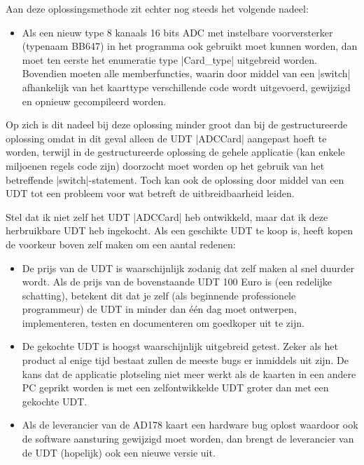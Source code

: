 \begin{cpplstShortInline}

Aan deze oplossingsmethode zit echter nog steeds het volgende nadeel:
\begin{itemize}
    \item Als een nieuw type 8 kanaals 16 bits ADC met instelbare voorversterker (typenaam BB647) in het programma ook gebruikt moet kunnen worden, dan moet ten eerste het enumeratie type |Card_type| uitgebreid worden.
    Bovendien moeten alle memberfuncties, waarin door middel van een |switch| afhankelijk van het kaarttype verschillende code wordt uitgevoerd, gewijzigd en opnieuw gecompileerd worden.
\end{itemize}

Op zich is dit nadeel bij deze oplossing minder groot dan bij de gestructureerde oplossing omdat in dit geval alleen de UDT |ADCCard| aangepast hoeft te worden, terwijl in de gestructureerde oplossing de gehele applicatie (kan enkele miljoenen regels code zijn) doorzocht moet worden op het gebruik van het betreffende |switch|\hyp{}statement.
Toch kan ook de oplossing door middel van een UDT tot een probleem voor wat betreft de uitbreidbaarheid leiden.

Stel dat ik niet zelf het UDT |ADCCard| heb ontwikkeld, maar dat ik deze herbruikbare UDT heb ingekocht.
Als een geschikte UDT te koop is, heeft kopen de voorkeur boven zelf maken om een aantal redenen:
\begin{itemize}
    \item De prijs van de UDT is waarschijnlijk zodanig dat zelf maken al snel duurder wordt.
    Als de prijs van de bovenstaande UDT 100 Euro is (een redelijke schatting), betekent dit dat je zelf (als beginnende professionele programmeur) de UDT in minder dan één dag moet ontwerpen, implementeren, testen en documenteren om goedkoper uit te zijn.
    \item De gekochte UDT is hoogst waarschijnlijk uitgebreid getest.
    Zeker als het product al enige tijd bestaat zullen de meeste bugs er inmiddels uit zijn.
    De kans dat de applicatie plotseling niet meer werkt als de kaarten in een andere PC geprikt worden is met een zelfontwikkelde UDT groter dan met een gekochte UDT.
    \item Als de leverancier van de AD178 kaart een hardware bug oplost waardoor ook de software aansturing gewijzigd moet worden, dan brengt de leverancier van de UDT (hopelijk) ook een nieuwe versie uit.
\end{itemize}


\end{cpplstShortInline}
